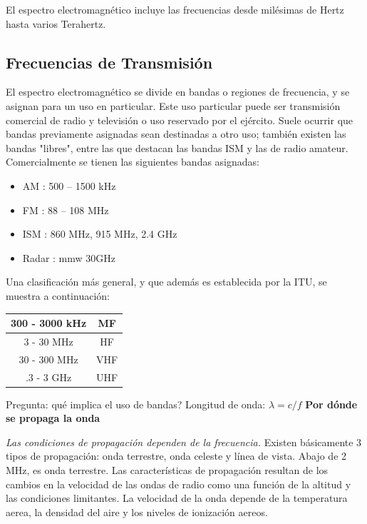 \documentclass[12pt,letterpaper,titlepage,twoside]{book}
\begin{document}
El espectro electromagnético incluye las frecuencias desde milésimas de Hertz hasta varios Terahertz.


\subsection{Frecuencias de Transmisión}

El espectro electromagnético se divide en bandas o regiones de frecuencia, y se asignan para un uso en particular. Este uso particular puede ser transmisión comercial de radio y televisión o uso reservado por el ejército. Suele ocurrir que bandas previamente asignadas sean destinadas a otro uso; también existen las bandas "libres", entre las que destacan las bandas ISM y las de radio amateur. Comercialmente se tienen las siguientes bandas asignadas: 

\begin{itemize}
\item AM : 500 – 1500 kHz
\item FM : 88 – 108 MHz
\item ISM : 860 MHz, 915 MHz, 2.4 GHz
\item Radar : mmw  30GHz
\end{itemize}

Una clasificación más general, y que además es establecida por la ITU, se muestra a continuación:



\begin{tabular}{|c|c|}
\hline 
300 - 3000 kHz & MF \\ 
\hline 
3 - 30 MHz & HF \\ 
\hline 
30 -  300 MHz & VHF \\ 
\hline 
.3 - 3 GHz & UHF \\ 
\hline 
\end{tabular} 

Pregunta: qué implica el uso de bandas? 
Longitud de onda: $\lambda = c/f$
\textbf{Por dónde se propaga la onda}

\emph{Las condiciones de propagación dependen de la frecuencia.}  Existen básicamente 3 tipos de propagación: onda terrestre, onda celeste y línea de vista. Abajo de 2 MHz, es onda terrestre. Las características de propagación resultan de los cambios en la velocidad de las ondas de radio como una función de la altitud y las condiciones limitantes. La velocidad de la onda depende de la temperatura aerea, la densidad del aire y los niveles de ionización aereos.
\end{document}
